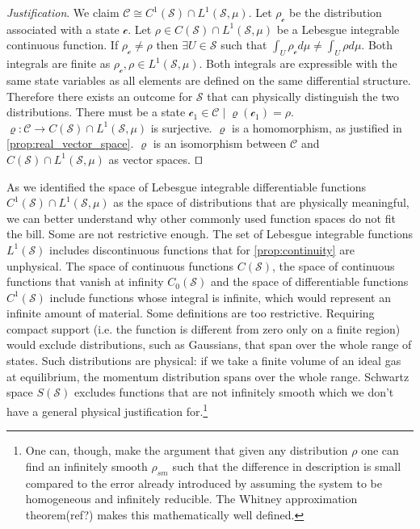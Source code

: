 \documentclass[smallextended]{svjour3}
\numberwithin{equation}{section}
\newenvironment{justification}{\emph{Justification}.}{\hfill\(\qed\)}
\theoremstyle{definition}
\newenvironment{justification}{\emph{Justification}.}{\qed}
\begin{document}
\begin{justification}
	We claim $\mathcal{C} \cong C^1(\mathcal{S}) \cap L^1(\mathcal{S}, \mu)$. Let $\rho_\mathcal{c}$ be the distribution associated with a state $\mathcal{c}$. Let $\rho \in C(\mathcal{S}) \cap  L^1(\mathcal{S}, \mu)$ be a Lebesgue integrable continuous function. If $\rho_\mathcal{c} \neq \rho$ then $\exists U \in \mathcal{S}$ such that $\int_{U} \rho_\mathcal{c} d \mu \neq \int_{U} \rho d \mu$. Both integrals are finite as $\rho_\mathcal{c}, \rho \in L^1(\mathcal{S}, \mu)$. Both integrals are expressible with the same state variables as all elements are defined on the same differential structure. Therefore there exists an outcome for $\mathcal{S}$ that can physically distinguish the two distributions. There must be a state $\mathcal{c}_1 \in \mathcal{C} \; | \; \varrho(\mathcal{c}_1)=\rho$. $\varrho : \mathcal{C} \rightarrow C(\mathcal{S}) \cap  L^1(\mathcal{S}, \mu)$ is surjective. $\varrho$ is a homomorphism, as justified in \ref{prop:real_vector_space}. $\varrho$ is an isomorphism between $\mathcal{C}$ and $C(\mathcal{S}) \cap  L^1(\mathcal{S}, \mu)$ as vector spaces.
\end{justification}

As we identified the space of Lebesgue integrable differentiable functions $C^1(\mathcal{S}) \cap  L^1(\mathcal{S}, \mu)$ as the space of distributions that are physically meaningful, we can better understand why other commonly used function spaces do not fit the bill. Some are not restrictive enough. The set of Lebesgue integrable functions $L^1(\mathcal{S})$ includes discontinuous functions that for \ref{prop:continuity} are unphysical. The space of continuous functions $C(\mathcal{S})$, the space of continuous functions that vanish at infinity $C_0(\mathcal{S})$ and the space of differentiable functions $C^1(\mathcal{S})$ include functions whose integral is infinite, which would represent an infinite amount of material. Some definitions are too restrictive. Requiring compact support (i.e. the function is different from zero only on a finite region) would exclude distributions, such as Gaussians, that span over the whole range of states. Such distributions are physical: if we take a finite volume of an ideal gas at equilibrium, the momentum distribution spans over the whole range. Schwartz space $S(\mathcal{S})$ excludes functions that are not infinitely smooth which we don't have a general physical justification for.\footnote{One can, though, make the argument that given any distribution $\rho$ one can find an infinitely smooth $\rho_{sm}$ such that the difference in description is small compared to the error already introduced by assuming the system to be homogeneous and infinitely reducible. The Whitney approximation theorem(ref?) makes this mathematically well defined.}
\end{document}
